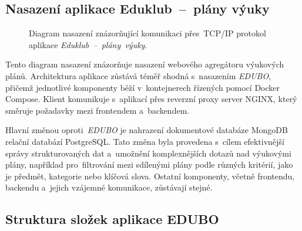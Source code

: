 \documentclass[male,czech,api_bc]{kitheses}
\begin{document}
\subsection{Nasazení aplikace Eduklub~--~plány výuky}

\begin{figure}[H]
	\centering
	\caption{Diagram nasazení znázorňující komunikaci přes~TCP/IP protokol aplikace \mbox{\textit{Eduklub~--~plány výuky}.}}
	\label{fig:deployment-diagram-2}
\end{figure}


Tento diagram nasazení znázorňuje nasazení webového agregátoru výukových plánů. Architektura aplikace zůstává téměř shodná s~nasazením \textit{EDUBO}, přičemž jednotlivé komponenty běží v~kontejnerech řízených pomocí Docker Compose. Klient komunikuje s~aplikací přes reverzní proxy server NGINX, který směruje požadavky mezi frontendem a~backendem.

Hlavní změnou oproti~\textit{EDUBO} je nahrazení dokumentové databáze MongoDB relační databází PostgreSQL. Tato změna byla provedena s~cílem efektivnější správy strukturovaných dat a~umožnění komplexnějších dotazů nad výukovými plány, například pro~filtrování mezi sdílenými plány podle různých kritérií, jako je předmět, kategorie nebo klíčová slova. Ostatní komponenty, včetně frontendu, backendu a~jejich vzájemné komunikace, zůstávají stejné.

\subsection{Struktura složek aplikace EDUBO}
\end{document}
